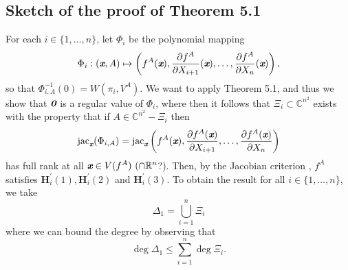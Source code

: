 \documentclass[sigconf]{acmart}
\def\bz{\textit{\textbf{0}}}
\def\xb{\textit{\textbf{x}}}
\def\C{\mathbb{C}}
\def\R{\mathbb{R}}
\def\jac{ \textrm{jac}}
\def\pa{\partial}
\begin{document}
\subsection{Sketch of the proof of Theorem 5.1}
%
For each $i \in \{1,\hdots,n\}$, let $\Phi_i$ be the polynomial mapping 
\[
\Phi_i : (\xb,A) \mapsto \left(f^A(\xb), \frac{\partial f^A}{\partial X_{i+1}}(\xb),\hdots,\frac{\partial f^A}{\partial X_n}(\xb)\right),
\] 
so that $\Phi_{i,A}^{-1}(0)= W(\pi_i,V^A).$ We want to apply Theorem 5.1, and thus we show that $\bz$ is a regular value of $\Phi_i$, where then it follows that $\Xi_i \subset \C^{n^2}$ exists with the property that if $A \in \C^{n^2}-\Xi_i$ then  
\[
\jac_{\xb}(\Phi_{i,A}) = \jac_{\xb}\left(f^A(\xb),\frac{\pa f^A(\xb)}{\pa X_{i+1}},\hdots,\frac{\pa f^A(\xb)}{\pa X_n}\right)
\]
has full rank at all $\xb \in V(f^A)~(\cap\R^n$?). Then, by the Jacobian criterion \cite[Theorem 16.19]{ECA}, $f^A$ satisfies $\textbf{H}_i^{'}(1),\textbf{H}_i^{'}(2)$ and $\textbf{H}_i^{'}(3)$. To obtain the result for all $i \in \{1,\hdots,n\}$, we take 
\[
\Delta_1 = \bigcup_{i=1}^n \Xi_i 
\]
where we can bound the degree by observing that 
\[
\deg \Delta_1 \leq \sum_{i=1}^n \deg \Xi_i.
\]
%
\end{document}
